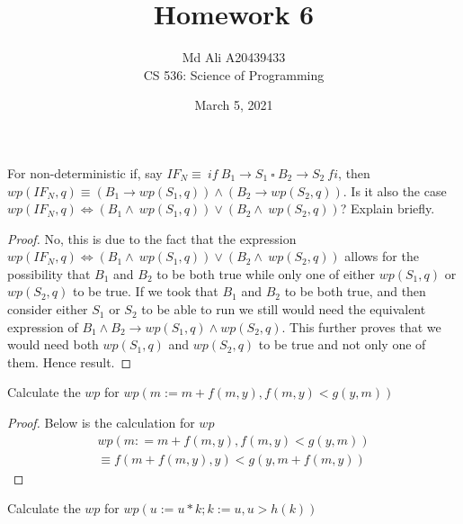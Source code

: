 \documentclass[12pt]{article}
\newenvironment{exercise}[2][Exercise]{\begin{trivlist}
\item[\hskip \labelsep {\bfseries #1}\hskip \labelsep {\bfseries #2.}]}{\end{trivlist}}
\begin{document}
 
\title{Homework 6}
\author{Md Ali A20439433 \\ 
CS 536: Science of Programming} 
\date{March 5, 2021}

\maketitle
 
\begin{exercise}{1}
For non-deterministic if, say $IF_{N} \equiv\: if\: B_{1} \rightarrow S_{1}\: \square\: B_{2} \rightarrow S_{2}\: fi$, then $wp(IF_{N}, q) \equiv (B_{1} \rightarrow wp(S_{1}, q)) \land (B_{2} \rightarrow wp(S_{2}, q))$. Is it also the case $wp(IF_{N}, q) \Leftrightarrow (B_{1} \land\: wp(S_{1}, q)) \lor (B_{2} \land\: wp(S_{2}, q))$? Explain briefly.  
\end{exercise} 

\begin{proof}
No, this is due to the fact that the expression $wp(IF_{N}, q) \Leftrightarrow (B_{1} \land\: wp(S_{1}, q)) \lor (B_{2} \land\: wp(S_{2}, q))$ allows for the possibility that $B_{1}$ and $B_{2}$ to be both true while only one of either $wp(S_{1}, q)$ or $wp(S_{2}, q)$ to be true. If we took that $B_{1}$ and $B_{2}$ to be both true, and then consider either $S_{1}$ or $S_{2}$ to be able to run we still would need the equivalent expression of $B_{1} \land B_{2} \rightarrow wp(S_{1}, q) \land wp(S_{2},q)$. This further proves that we would need both $wp(S_{1}, q)$ and $wp(S_{2}, q)$ to be true and not only one of them. Hence result.

\end{proof}

\begin{exercise}{2}
Calculate the $wp$ for $wp(m := m + f(m,y), f(m,y) < g(y,m))$
\end{exercise}
 
\begin{proof}
Below is the calculation for $wp$ 
\begin{gather*}
    wp(m : = m + f(m,y), f(m,y) < g(y,m)) \\
    \equiv f(m + f(m,y),y) < g(y, m + f(m,y))
\end{gather*}

\end{proof}

\begin{exercise}{3}
Calculate the $wp$ for $wp(u := u*k; k:=u, u > h(k))$
\end{exercise}
\end{document}
